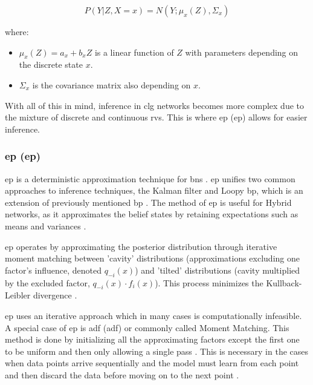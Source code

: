 \documentclass[12pt,a4paper]{article}
\begin{document}
\begin{equation}P(Y | Z, X=x) = N(Y; \mu_{x}(Z), \Sigma_{x})\end{equation}

where:

\begin{itemize}
	\item $\mu_{x}(Z) = a_{x} + b_{x}Z$ is a linear function of $Z$ with parameters depending on the discrete state $x$.
	\item $\Sigma_{x}$ is the covariance matrix also depending on $x$.
\end{itemize}

With all of this in mind, inference in \acs{clg} networks becomes more complex due to the mixture of discrete and continuous \acs{rv}s. This is where \acl{ep} (\acs{ep}) allows for easier inference.

\subsubsection{\acl{ep} (\acs{ep})}

\acs{ep} is a deterministic approximation technique for \acs{bn}s \parencite{minka2013ep}. \acs{ep} unifies two common approaches to inference techniques, the Kalman filter and Loopy \acs{bp}, which is an extension of previously mentioned \acs{bp} \parencite{minka2013ep}. The method of \acs{ep} is useful for Hybrid networks, as it approximates the belief states by retaining expectations such as means and variances \parencite{minka2013ep}.

\acs{ep} operates by approximating the posterior distribution through iterative moment matching between 'cavity' distributions (approximations excluding one factor's influence, denoted \(q_{-i}(x)\)) and 'tilted' distributions (cavity multiplied by the excluded factor, \(q_{-i}(x) \cdot f_i(x)\)). This process minimizes the Kullback-Leibler divergence \parencite{minka2001expectation,heskes2006approximate}.

\acs{ep} uses an iterative approach which in many cases is computationally infeasible. A special case of \acs{ep} is \acl{adf} (\acs{adf}) or commonly called Moment Matching. This method is done by initializing all the approximating factors except the first one to be uniform and then only allowing a single pass \parencite[510]{bishop2006prml}. This is necessary in the cases when data points arrive sequentially and the model must learn from each point and then discard the data before moving on to the next point \parencite[510]{bishop2006prml}.
\end{document}
